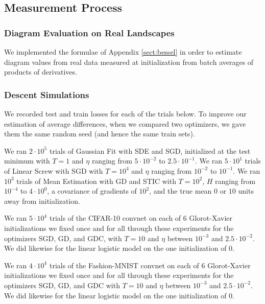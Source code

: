 \documentclass{article}
\theoremstyle{plain}
\theoremstyle{definition}
\begin{document}
    \subsection{Measurement Process}
        \subsubsection*{Diagram Evaluation on Real Landscapes}
            We implemented the formulae of Appendix \ref{sect:bessel} in order
            to estimate diagram values from real data measured at
            initialization from batch averages of products of derivatives.

        \subsubsection*{Descent Simulations}
            We recorded test and train losses for each of the trials below.  To
            improve our estimation of average differences, when we compared two
            optimizers, we gave them the same random seed (and hence the same
            train sets).

            We ran $2 \cdot 10^5$ trials of Gaussian Fit with SDE and SGD,
            initialized at the test minimum with $T=1$ and $\eta$ ranging from
            $5\cdot 10^{-2}$ to $2.5\cdot 10^{-1}$.
            We ran $5 \cdot 10^1$ trials of Linear Screw with SGD with $T=10^4$
            and $\eta$ ranging from $10^{-2}$ to $10^{-1}$.
            We ran $10^3$ trials of Mean Estimation with GD and STIC
            with $T=10^2$, $H$ ranging from $10^{-4}$ to $4 \cdot 10^0$,
            a covariance of gradients of $10^2$, and the true mean $0$ or
            $10$ units away from initialization.

            We ran $5 \cdot 10^4$ trials of the CIFAR-10 convnet on each of $6$
            Glorot-Xavier initializations we fixed once and for all through
            these experiments for the optimizers SGD, GD, and GDC, with $T=10$
            and $\eta$ between $10^{-3}$ and $2.5 \cdot 10^{-2}$.  We did
            likewise for the linear logistic model on the one initialization of
            $0$.

            We ran $4 \cdot 10^4$ trials of the Fashion-MNIST convnet on each
            of $6$ Glorot-Xavier initializations we fixed once and for all
            through these experiments for the optimizers SGD, GD, and GDC with
            $T=10$ and $\eta$ between $10^{-3}$ and $2.5 \cdot 10^{-2}$.  We
            did likewise for the linear logistic model on the one
            initialization of $0$. 
\end{document}

